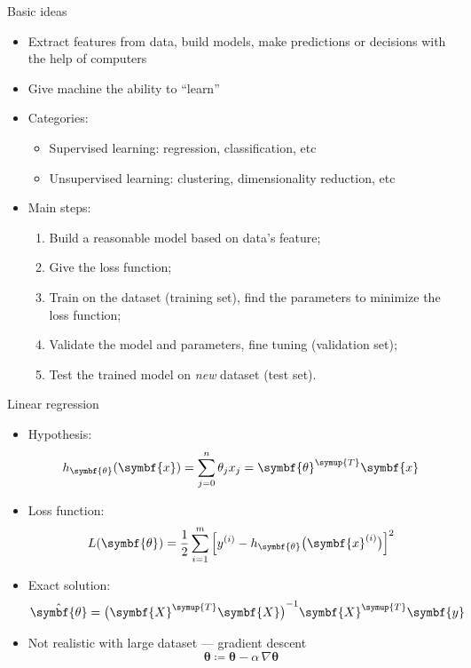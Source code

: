 \documentclass[aspectratio=169]{beamer}
\def\trans{{\symup{T}}}
\def\bm#1{{\symbf{#1}}}
\begin{document}
\begin{frame}{Basic ideas}
\begin{itemize}
  \item Extract features from data, build models, make predictions or decisions with the help of
    computers
  \item Give machine the ability to ``learn''
  \item Categories:
    \begin{itemize}
      \item Supervised learning: regression, classification, etc
      \item Unsupervised learning: clustering, dimensionality reduction, etc
    \end{itemize}
  \item Main steps:
    \begin{enumerate}
      \item Build a reasonable model based on data's feature;
      \item Give the \alert{loss function};
      \item Train on the dataset (training set), find the parameters to minimize the loss function;
      \item Validate the model and parameters, fine tuning (validation set);
      \item Test the trained model on \emph{new} dataset (test set).
    \end{enumerate}
\end{itemize}  
\end{frame}

\begin{frame}{Linear regression}
\begin{itemize}
  \item Hypothesis:
    \[ h_\bm{\theta} (\bm{x}) = \sum_{j=0}^n \theta_j x_j = \bm{\theta}^\trans \bm{x} \]
  \item Loss function:
    \[
      L(\bm{\theta})
      = \frac{1}{2} \sum_{i=1}^m \qty\Big[y^{(i)} - h_\bm{\theta}\qty\big(\bm{x}^{(i)})]^2
    \]
  \item Exact solution:
    \[ \hat{\bm{\theta}} = \qty\big(\bm{X}^\trans\bm{X})^{-1} \bm{X}^\trans \bm{y} \]
  \item Not realistic with large dataset --- \alert{gradient descent}
    \[ \bm{\theta} \coloneq \bm{\theta} - \alpha \, \nabla\bm{\theta} \]
\end{itemize}
\end{frame}
\end{document}
